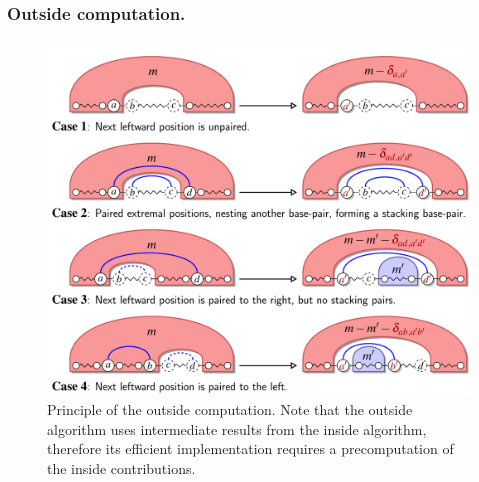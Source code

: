 \subsubsection{Outside computation.}	
\begin{figure}[t]\centering
\includegraphics[scale=\ScaleDP]{FigDPOutsideWrapper}
\caption{Principle of the outside computation. Note that the outside algorithm uses intermediate results from the inside algorithm, 
therefore its efficient implementation requires a precomputation of the inside contributions.}
\end{figure}


